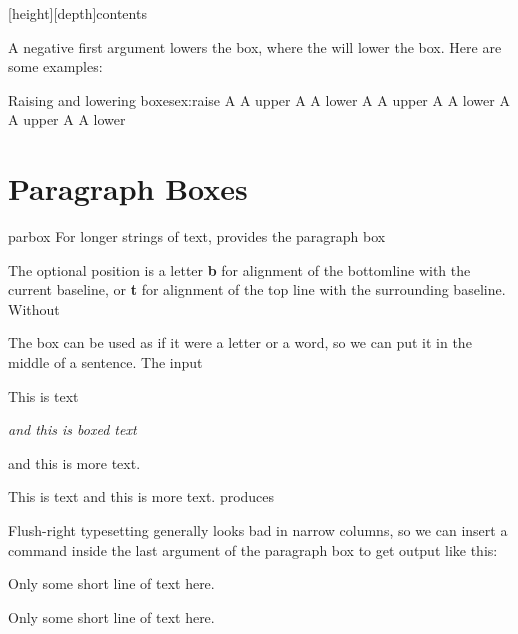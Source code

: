{\begin{teX}
\raisebox{raiselength}[height][depth]{contents}
\end{teX}

A negative first argument lowers the box, where the \cmd{\lowerbox} will lower the box. Here are some examples:

\begin{texexample}{Raising and lowering boxes}{ex:raise}
A  A
upper
A  A
lower
A  A
upper
A  A
lower
A  A
upper
A  A
lower
\end{texexample}

\section{Paragraph Boxes}

\begin{docCommand}{parbox}{ }
  For longer strings of text, \latex provides the paragraph box \cs{parbox} 
\end{docCommand}


The optional position
is a letter \textbf{b} for alignment of the bottomline with the current baseline,
or \textbf{t} for alignment of the top line with the surrounding baseline. Without

The box can be used as if it were a letter or a word, so we can put it in
the middle of a sentence. The input

This is text \parbox{30pt}{\it and this is boxed text} and
this is more text.

This is text 
and this is more text.
produces


Flush-right typesetting generally looks bad in narrow columns, so we
can insert a \cs{raggedright} command inside the last argument of the paragraph
box to get output like this:

\begin{texexample}{}{}

\parbox[b][120pt][t]{130pt}{\lorem}%
\hspace{1cm}%
\parbox[b][150pt][t]{130pt}{Only some short line of text here.}%



\parbox[b][120pt][t]{130pt}{\lorem}\hspace{1cm}\parbox[b][120pt][c]{130pt}{Only some short line of text here.}


\end{texexample}}
